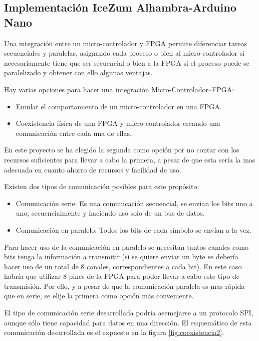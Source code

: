 \subsection{Implementación IceZum Alhambra-Arduino Nano}\label{sec:Integracion}

Una integración entre un micro-controlador y FPGA permite diferenciar tareas secuenciales y paralelas, asignando cada proceso o bien al micro-controlador si necesariamente tiene que ser secuencial o bien a la FPGA si el proceso puede se paralelizado y obtener con ello algunas ventajas. \newline

Hay varias opciones para hacer una integración Micro-Controlador--FPGA:

\begin{itemize}
	\item Emular el comportamiento de un micro-controlador en una FPGA.
	\item Coexistencia física de una FPGA y micro-controlador creando una comunicación entre cada una de ellas.
\end{itemize}
En este proyecto se ha elegido la segunda como opción por no contar con los recursos suficientes para llevar a cabo la primera, a pesar de que esta sería la mas adecuada en cuanto ahorro de recursos y facilidad de uso. \newline

Existen dos tipos de comunicación posibles para este propósito: 
\begin{itemize}
	\item Comunicación serie: Es una comunicación secuencial, se envían los bits uno a uno, secuencialmente y haciendo uso solo de un bus de datos.
	\item Comunicación en paralelo: Todos los bits de cada símbolo se envían a la vez.
\end{itemize} 

Para hacer uso de la comunicación en paralelo se necesitan tantos canales como bits tenga la información a transmitir (si se quiere enviar un byte se debería hacer uso de un total de 8 canales, correspondientes a cada bit). En este caso habría que utilizar 8 pines de la FPGA para poder llevar a cabo este tipo de transmisión. Por ello, y a pesar de que la comunicación paralela es mas rápida que en serie, se elije la primera como opción más conveniente. \newline

El tipo de comunicación serie desarrollada podría asemejarse a un protocolo SPI, aunque sólo tiene capacidad para datos en una dirección. El esquemático de esta comunicación desarrollada es el expuesto en la figura \ref{fig:coexistencia2}.


